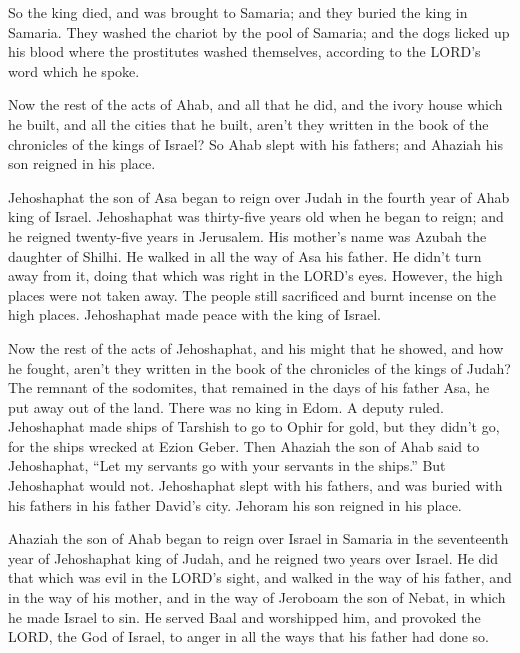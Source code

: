  So the king died, and was brought to Samaria; and they
buried the king in Samaria.  They washed the chariot by
the pool of Samaria; and the dogs licked up his blood where the
prostitutes washed themselves, according to the LORD's word which he
spoke.

 Now the rest of the acts of Ahab, and all that he did,
and the ivory house which he built, and all the cities that he built,
aren't they written in the book of the chronicles of the kings of
Israel?  So Ahab slept with his fathers; and Ahaziah his
son reigned in his place.

 Jehoshaphat the son of Asa began to reign over Judah in
the fourth year of Ahab king of Israel.  Jehoshaphat was
thirty-five years old when he began to reign; and he reigned twenty-five
years in Jerusalem. His mother's name was Azubah the daughter of Shilhi.
 He walked in all the way of Asa his father. He didn't
turn away from it, doing that which was right in the LORD's eyes.
However, the high places were not taken away. The people still
sacrificed and burnt incense on the high places. 
Jehoshaphat made peace with the king of Israel.

 Now the rest of the acts of Jehoshaphat, and his might
that he showed, and how he fought, aren't they written in the book of
the chronicles of the kings of Judah?  The remnant of the
sodomites, that remained in the days of his father Asa, he put away out
of the land.  There was no king in Edom. A deputy ruled.
 Jehoshaphat made ships of Tarshish to go to Ophir for
gold, but they didn't go, for the ships wrecked at Ezion Geber.
 Then Ahaziah the son of Ahab said to Jehoshaphat, ``Let
my servants go with your servants in the ships.'' But Jehoshaphat would
not.  Jehoshaphat slept with his fathers, and was buried
with his fathers in his father David's city. Jehoram his son reigned in
his place.

 Ahaziah the son of Ahab began to reign over Israel in
Samaria in the seventeenth year of Jehoshaphat king of Judah, and he
reigned two years over Israel.  He did that which was
evil in the LORD's sight, and walked in the way of his father, and in
the way of his mother, and in the way of Jeroboam the son of Nebat, in
which he made Israel to sin.  He served Baal and
worshipped him, and provoked the LORD, the God of Israel, to anger in
all the ways that his father had done so.
